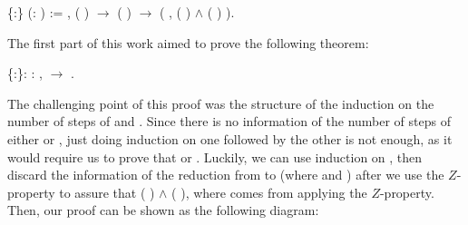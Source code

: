 \documentclass[conference]{IEEEtran}
\begin{document}
\begin{coqdoccode}
  \coqdocnoindent{} 
  \{:\} (: 
  ) := \coqdockw{\ensuremath{\forall}} 
   , ( )
    \ensuremath{\rightarrow}
  ( )  
  \ensuremath{\rightarrow} (\coqdoctac{\ensuremath{\exists}}
  , ( ) 
   \ensuremath{\land} (
  )  ).\coqdoceol
\end{coqdoccode}

The first part of this work aimed to prove the following theorem:

\begin{coqdoccode}
\coqdocnoindent
{}  \{:\}: \coqdockw{\ensuremath{\forall}} :  ,   \ensuremath{\rightarrow}  .\coqdoceol
\end{coqdoccode}
  
The challenging point of this proof was the structure of the induction on the number of steps of     and    . Since there is no information of the number of steps of either     or    , just doing induction on one followed by the other is not enough, as it would require us to prove that     or    . Luckily, we can use induction on    , then discard the information of the reduction from  to  (where    and    ) after we use the $Z$-property to assure that    ( ) \ensuremath{\land}    ( ), where   comes from applying the $Z$-property. Then, our proof can be shown as the following diagram:
\end{document}
